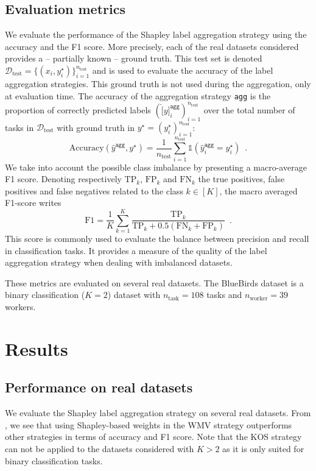 \documentclass{cap2024}
\begin{document}
\subsection{Evaluation metrics}

We evaluate the performance of the Shapley label aggregation strategy using the accuracy and the F1 score.
More precisely, each of the real datasets considered provides a -- partially known -- ground truth.
This test set is denoted $\mathcal{D}_\text{test}=\{(x_i, y_i^\star)\}_{i=1}^{n_\text{test}}$ and is used to evaluate the accuracy of the label aggregation strategies.
This ground truth is not used during the aggregation, only at evaluation time.
The accuracy of the aggregation strategy \texttt{agg} is the proportion of correctly predicted labels $(\hat[y]^\texttt{agg}_i)_{i=1}^{n_\text{test}}$ over the total number of tasks in $\mathcal{D}_\text{test}$ with ground truth in $y^\star=(y_i^\star)_{i=1}^{n_\text{test}}$:
\[\mathrm{Accuracy}(\hat{y}^\texttt{agg}, y^\star) = \frac{1}{n_\text{test}}\sum_{i=1}^{n_\text{test}} \mathds{1}(\hat{y}^\texttt{agg}_i=y_i^\star) \enspace.\]
We take into account the possible class imbalance by presenting a macro-average F1 score. Denoting respectively $\mathrm{TP}_k$, $\mathrm{FP}_k$ and $\mathrm{FN}_k$ the true positives, false positives and false negatives related to the class $k\in[K]$, the macro averaged F1-score writes
\[
\mathrm{F1} = \frac{1}{K}\sum_{k=1}^K\frac{\mathrm{TP}_k}{\mathrm{TP}_k + 0.5(\mathrm{FN}_k + \mathrm{FP}_k)}\enspace.
\]
This score is commonly used to evaluate the balance between precision and recall in classification tasks. It provides a measure of the quality of the label aggregation strategy when dealing with imbalanced datasets.

These metrics are evaluated on several real datasets.
The BlueBirds dataset \citep{WelinderEtal10b} is a binary classification ($K=2$) dataset with $n_\text{task}=108$ tasks and $n_\text{worker}=39$ workers.

\section{Results}
\label{sec:results}
\subsection{Performance on real datasets}

We evaluate the Shapley label aggregation strategy on several real datasets.
From , we see that using Shapley-based weights in the WMV strategy outperforms other strategies in terms of accuracy and F1 score.
Note that the KOS strategy can not be applied to the datasets considered with $K>2$ as it is only suited for binary classification tasks.
\end{document}
